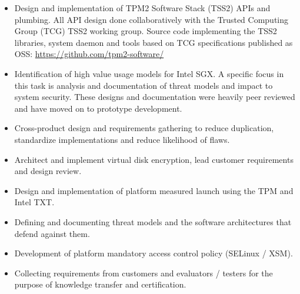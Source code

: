 \documentclass[letterpaper,11pt]{article}
\begin{document}
    \begin {itemize}
      \setlength {\itemsep}{1pt}
      \setlength {\parskip}{0pt}
      \setlength {\parsep}{0pt}
      \item Design and implementation of TPM2 Software Stack (TSS2) APIs and
            plumbing. All API design done collaboratively with the Trusted
            Computing Group (TCG) TSS2 working group. Source code implementing
            the TSS2 libraries, system daemon and tools based on TCG
            specifications published as OSS:
            \url{https://github.com/tpm2-software/}
      \item Identification of high value usage models for Intel\textsuperscript{\textregistered} SGX.
            A specific focus in this task is analysis and documentation of threat models and impact to system security.
            These designs and documentation were heavily peer reviewed and have moved on to prototype development.
    \end {itemize}
    \begin {itemize}
        \setlength {\itemsep}{1pt}
        \setlength {\parskip}{0pt}
        \setlength {\parsep}{0pt}
      \item Cross-product design and requirements gathering to reduce duplication, standardize implementations and reduce likelihood of flaws.
      \item Architect and implement virtual disk encryption, lead customer requirements and design review.
    \end {itemize}
    \begin {itemize}
        \setlength {\itemsep}{1pt}
        \setlength {\parskip}{0pt}
        \setlength {\parsep}{0pt}
      \item Design and implementation of platform measured launch using the TPM and Intel\textsuperscript{\textregistered} TXT.
      \item Defining and documenting threat models and the software architectures that defend against them.
      \item Development of platform mandatory access control policy (SELinux / XSM).
      \item Collecting requirements from customers and evaluators / testers for the purpose of knowledge transfer and certification.
    \end {itemize}
\end{document}
